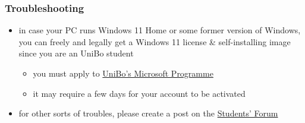 \documentclass[presentation]{beamer}\mode<presentation>{\usetheme{AMSBolognaFC}}
\begin{document}
\begin{frame}\label{troubleshooting}
\frametitle{Troubleshooting}
    \begin{itemize}
        \item in case your PC runs Windows 11 Home or some former version of Windows, you can freely and legally get a Windows 11 license \& self-installing image since you are an UniBo student
        \begin{itemize}
            \item you must apply to \href{https://dreamspark.campusfc.unibo.it/}{UniBo's Microsoft Programme}
            \item it may require a few days for your account to be activated
        \end{itemize}

        \vspace{.3cm}

        \item for other sorts of troubles, please create a post on the \href{\generalForum}{Students' Forum}

    \end{itemize}
\end{frame}

\maketitle

\end{document}
